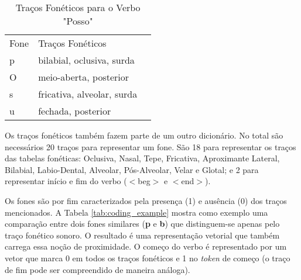 \begin{table}[H]
\begin{center}
\begin{tabular}{lll}
Fone & Traços Fonéticos &  \\ \cline{1-2}
p & bilabial, oclusiva, surda &  \\
O & meio-aberta, posterior &  \\
s & fricativa, alveolar, surda &  \\
u & fechada, posterior & 
\end{tabular}
\end{center}
\caption{Traços Fonéticos para o Verbo "Posso"}
\label{tab:pOsu}
\end{table}

Os traços fonéticos também fazem parte de um outro dicionário. No total são necessários 20 traços para representar um fone. São 18 para representar os traços das tabelas fonéticas: Oclusiva, Nasal, Tepe, Fricativa, Aproximante Lateral, Bilabial, Labio-Dental, Alveolar, Pós-Alveolar, Velar e Glotal; e 2 para representar início e fim do verbo ($<$beg$>$ e $<$end$>$).

Os fones são por fim caracterizados pela presença (1) e ausência (0) dos traços mencionados.  A Tabela \ref{tab:coding_example} mostra como exemplo uma comparação entre dois fones similares (\textbf{p} e \textbf{b}) que distinguem-se apenas pelo traço fonético sonoro. O resultado é uma representação vetorial que também carrega essa noção de proximidade. O começo do verbo é representado por um vetor que marca 0 em todos os traços fonéticos e 1 no \textit{token} de começo (o traço de fim pode ser compreendido de maneira análoga). 

